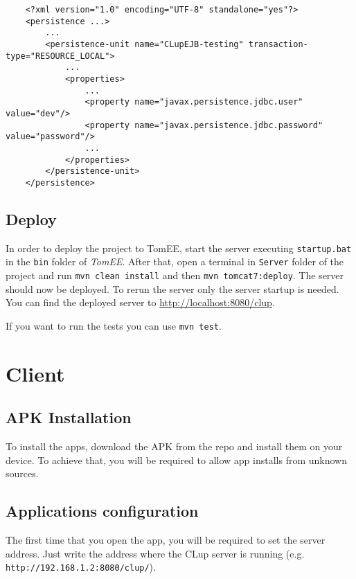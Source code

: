 \begin{lstlisting}
	<?xml version="1.0" encoding="UTF-8" standalone="yes"?>
	<persistence ...>
		...
		<persistence-unit name="CLupEJB-testing" transaction-type="RESOURCE_LOCAL">
			...
			<properties>
				...
				<property name="javax.persistence.jdbc.user" value="dev"/>
				<property name="javax.persistence.jdbc.password" value="password"/>
				...
			</properties>
		</persistence-unit>
	</persistence>
\end{lstlisting}


\subsection{Deploy}
In order to deploy the project to TomEE, start the server executing \verb|startup.bat| in the \verb|bin| folder of \textit{TomEE}.\newline
After that, open a terminal in \verb|Server| folder of the project and run \verb|mvn clean install| and then \verb|mvn tomcat7:deploy|.\newline
The server should now be deployed. To rerun the server only the server startup is needed.\newline
You can find the deployed server to \href{http://localhost:8080/clup}{http://localhost:8080/clup}.

If you want to run the tests you can use \verb|mvn test|.

\clearpage

\section{Client}
\subsection{APK Installation}
To install the apps, download the APK from the repo and install them on your device.\newline
To achieve that, you will be required to allow app installs from unknown sources.
\subsection{Applications configuration}
The first time that you open the app, you will be required to set the server address.\newline
Just write the address where the CLup server is running (e.g. \verb|http://192.168.1.2:8080/clup/|).
